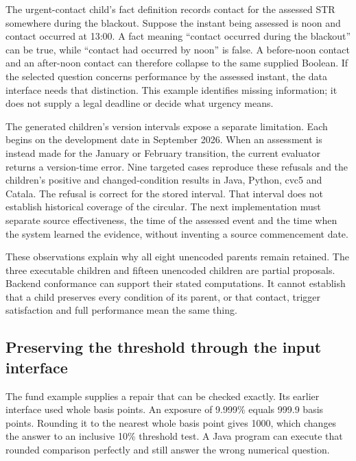 The urgent-contact child's fact definition records contact for the assessed STR
somewhere during the blackout. Suppose the instant being assessed is noon and
contact occurred at 13:00. A fact meaning ``contact occurred during the blackout''
can be true, while ``contact had occurred by noon'' is false. A before-noon
contact and an after-noon contact can therefore collapse to the same supplied
Boolean. If the selected question concerns performance by the assessed instant,
the data interface needs that distinction. This example identifies missing
information; it does not supply a legal deadline or decide what urgency means.

The generated children's version intervals expose a separate limitation. Each
begins on the development date in September 2026. When an assessment is instead
made for the January or February transition, the current evaluator returns a
version-time error. Nine targeted cases reproduce these refusals and the
children's positive and changed-condition results in Java, Python, cvc5 and
Catala. The refusal is correct for the stored interval. That interval does not
establish historical coverage of the circular. The next implementation must
separate source effectiveness, the time of the assessed event and the time when
the system learned the evidence, without inventing a source commencement date.

These observations explain why all eight unencoded parents remain retained.
The three executable children and fifteen unencoded children are partial
proposals. Backend conformance can support their stated computations. It cannot
establish that a child preserves every condition of its parent, or that contact,
trigger satisfaction and full performance mean the same thing.

\subsection{Preserving the threshold through the input interface}

The fund example supplies a repair that can be checked exactly. Its earlier
interface used whole basis points. An exposure of 9.999\% equals 999.9 basis
points. Rounding it to the nearest whole basis point gives 1000, which changes
the answer to an inclusive 10\% threshold test. A Java program can execute that
rounded comparison perfectly and still answer the wrong numerical question.

